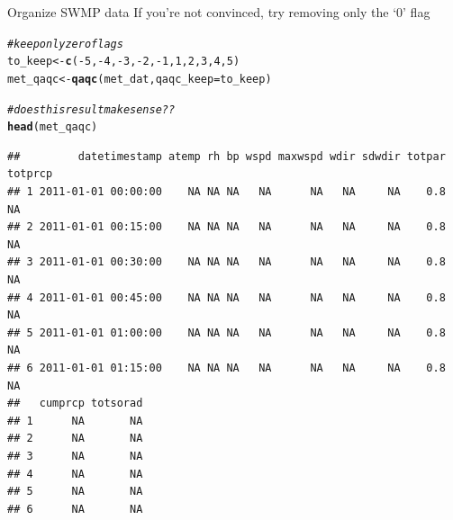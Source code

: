 \documentclass[xcolor=svgnames]{beamer}\usepackage[]{graphicx}\usepackage[]{color}
\makeatletter
\newcommand{\hlnum}[1]{\textcolor[rgb]{0.686,0.059,0.569}{#1}}%
\newcommand{\hlcom}[1]{\textcolor[rgb]{0.678,0.584,0.686}{\textit{#1}}}%
\newcommand{\hlopt}[1]{\textcolor[rgb]{0,0,0}{#1}}%
\newcommand{\hlstd}[1]{\textcolor[rgb]{0.345,0.345,0.345}{#1}}%
\newcommand{\hlkwb}[1]{\textcolor[rgb]{0.69,0.353,0.396}{#1}}%
\newcommand{\hlkwc}[1]{\textcolor[rgb]{0.333,0.667,0.333}{#1}}%
\newcommand{\hlkwd}[1]{\textcolor[rgb]{0.737,0.353,0.396}{\textbf{#1}}}%
\newenvironment{kframe}{%
 \def\at@end@of@kframe{}%
 \ifinner\ifhmode%
  \def\at@end@of@kframe{\end{minipage}}%
  \begin{minipage}{\columnwidth}%
 \fi\fi%
 \def\FrameCommand##1{\hskip\@totalleftmargin \hskip-\fboxsep
 \colorbox{shadecolor}{##1}\hskip-\fboxsep
     \hskip-\linewidth \hskip-\@totalleftmargin \hskip\columnwidth}%
 \MakeFramed {\advance\hsize-\width
   \@totalleftmargin\z@ \linewidth\hsize
   \@setminipage}}%
 {\par\unskip\endMakeFramed%
 \at@end@of@kframe}
\newenvironment{knitrout}{}{} %
\makeatother
\begin{document}
\begin{frame}[containsverbatim]{Organize SWMP data}
If you're not convinced, try removing only the `0' flag
\begin{knitrout}\scriptsize
{}\color{fgcolor}\begin{kframe}
\begin{alltt}
\hlcom{# keep only zero flags}
\hlstd{to_keep} \hlkwb{<-} \hlkwd{c}\hlstd{(}\hlopt{-}\hlnum{5}\hlstd{,} \hlopt{-}\hlnum{4}\hlstd{,} \hlopt{-}\hlnum{3}\hlstd{,} \hlopt{-}\hlnum{2}\hlstd{,} \hlopt{-}\hlnum{1}\hlstd{,} \hlnum{1}\hlstd{,} \hlnum{2}\hlstd{,} \hlnum{3}\hlstd{,} \hlnum{4}\hlstd{,} \hlnum{5}\hlstd{)}
\hlstd{met_qaqc} \hlkwb{<-} \hlkwd{qaqc}\hlstd{(met_dat,} \hlkwc{qaqc_keep} \hlstd{= to_keep)}

\hlcom{# does this result make sense??}
\hlkwd{head}\hlstd{(met_qaqc)}
\end{alltt}
\begin{verbatim}
##         datetimestamp atemp rh bp wspd maxwspd wdir sdwdir totpar totprcp
## 1 2011-01-01 00:00:00    NA NA NA   NA      NA   NA     NA    0.8      NA
## 2 2011-01-01 00:15:00    NA NA NA   NA      NA   NA     NA    0.8      NA
## 3 2011-01-01 00:30:00    NA NA NA   NA      NA   NA     NA    0.8      NA
## 4 2011-01-01 00:45:00    NA NA NA   NA      NA   NA     NA    0.8      NA
## 5 2011-01-01 01:00:00    NA NA NA   NA      NA   NA     NA    0.8      NA
## 6 2011-01-01 01:15:00    NA NA NA   NA      NA   NA     NA    0.8      NA
##   cumprcp totsorad
## 1      NA       NA
## 2      NA       NA
## 3      NA       NA
## 4      NA       NA
## 5      NA       NA
## 6      NA       NA
\end{verbatim}
\end{kframe}
\end{knitrout}
\end{frame}
\end{document}
